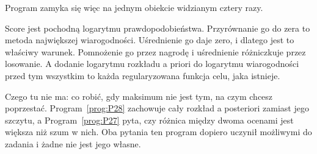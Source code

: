 \begin{fr}
Program zamyka się więc na jednym obiekcie widzianym cztery razy.

Score jest pochodną logarytmu prawdopodobieństwa. Przyrównanie go do zera to
metoda największej wiarogodności. Uśrednienie go daje zero, i dlatego jest to
właściwy warunek. Pomnożenie go przez nagrodę i uśrednienie różniczkuje przez
losowanie. A dodanie logarytmu rozkładu a priori do logarytmu wiarogodności
przed tym wszystkim to każda regularyzowana funkcja celu, jaka istnieje.


Czego tu nie ma: co robić, gdy maksimum nie jest tym, na czym chcesz
poprzestać. Program~\ref{prog:P28} zachowuje cały rozkład a posteriori
zamiast jego szczytu, a Program~\ref{prog:P27} pyta, czy różnica między
dwoma ocenami jest większa niż szum w nich. Oba pytania ten program dopiero
uczynił możliwymi do zadania i żadne nie jest jego własne.
\end{fr}

